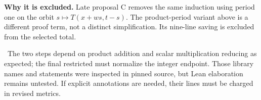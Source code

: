 \textbf{Why it is excluded.} Late proposal C removes the same induction using period one on the orbit $s\mapsto T(x+ws,t-s)$. The product-period variant above is a different proof term, not a distinct simplification. Its nine-line saving is excluded from the selected total.

\risk\ The two  steps depend on product addition and scalar multiplication reducing as expected; the final restricted  must normalize the integer endpoint. Those library names and statements were inspected in pinned source, but Lean elaboration remains untested. If explicit annotations are needed, their lines must be charged in revised metrics. \status
